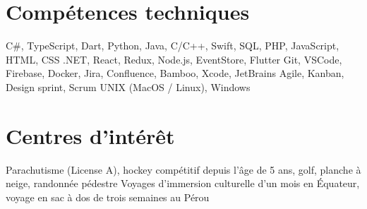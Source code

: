 \documentclass[letterpaper,11pt]{article}
\begin{document}
\resumeSubHeadingListEnd

\vspace{1pt}
\section{Comp\'etences techniques}
\resumeSubHeadingListStart

{C\#, TypeScript, Dart, Python, Java, C/C++, Swift, SQL, PHP, JavaScript, HTML, CSS}
{.NET, React, Redux, Node.js, EventStore, Flutter}
{Git, VSCode, Firebase, Docker, Jira, Confluence, Bamboo, Xcode, JetBrains} 
{Agile, Kanban, Design sprint, Scrum}
{UNIX (MacOS / Linux), Windows}
\resumeSubHeadingListEnd




\vspace{1pt}
\section{Centres d'int\'er\^et}
\resumeSubHeadingListStart
{}
{Parachutisme (License A), hockey comp\'etitif depuis l'\^age de 5 ans, golf, planche \`a neige, randonn\'ee p\'edestre}
{Voyages d'immersion culturelle d'un mois en \'Equateur, voyage en sac \`a dos de trois semaines au P\'erou}
\resumeSubHeadingListEnd
\end{document}
